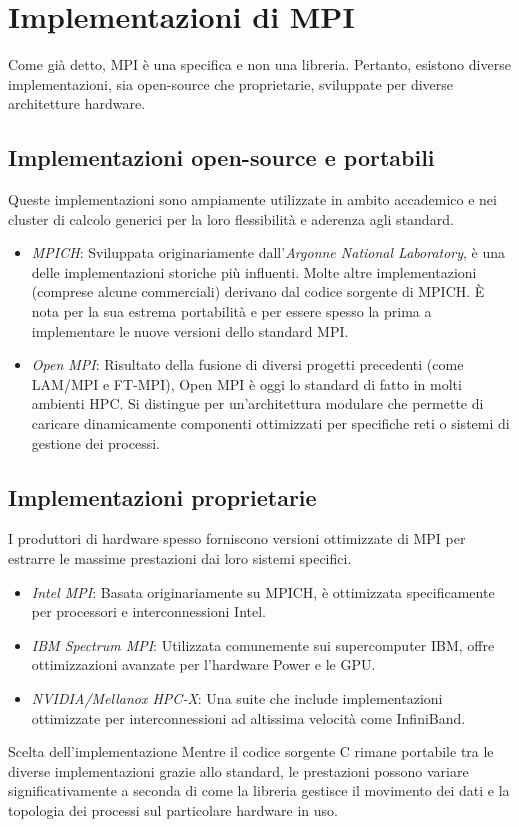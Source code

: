 \section{Implementazioni di MPI} 
Come già detto, MPI è una specifica e non una libreria.
Pertanto, esistono diverse implementazioni, sia open-source che proprietarie, sviluppate per diverse architetture hardware.

\subsection{Implementazioni open-source e portabili}
Queste implementazioni sono ampiamente utilizzate in ambito accademico e nei cluster di calcolo generici per la loro flessibilità e aderenza agli standard.

\begin{itemize}
    \item \emph{MPICH}: Sviluppata originariamente dall'\textit{Argonne National Laboratory}, è una delle implementazioni storiche più influenti. Molte altre implementazioni (comprese alcune commerciali) derivano dal codice sorgente di MPICH. È nota per la sua estrema portabilità e per essere spesso la prima a implementare le nuove versioni dello standard MPI.
    \item \emph{Open MPI}: Risultato della fusione di diversi progetti precedenti (come LAM/MPI e FT-MPI), Open MPI è oggi lo standard di fatto in molti ambienti HPC. Si distingue per un'architettura modulare che permette di caricare dinamicamente componenti ottimizzati per specifiche reti o sistemi di gestione dei processi.
\end{itemize}

\subsection{Implementazioni proprietarie}
I produttori di hardware spesso forniscono versioni ottimizzate di MPI per estrarre le massime prestazioni dai loro sistemi specifici.

\begin{itemize}
    \item \emph{Intel MPI}: Basata originariamente su MPICH, è ottimizzata specificamente per processori e interconnessioni Intel.
    \item \emph{IBM Spectrum MPI}: Utilizzata comunemente sui supercomputer IBM, offre ottimizzazioni avanzate per l'hardware Power e le GPU.
    \item \emph{NVIDIA/Mellanox HPC-X}: Una suite che include implementazioni ottimizzate per interconnessioni ad altissima velocità come InfiniBand.
\end{itemize}

\begin{observation}{Scelta dell'implementazione}
Mentre il codice sorgente C rimane portabile tra le diverse implementazioni grazie allo standard, le prestazioni possono variare significativamente a seconda di come la libreria gestisce il movimento dei dati e la topologia dei processi sul particolare hardware in uso.
\end{observation}
